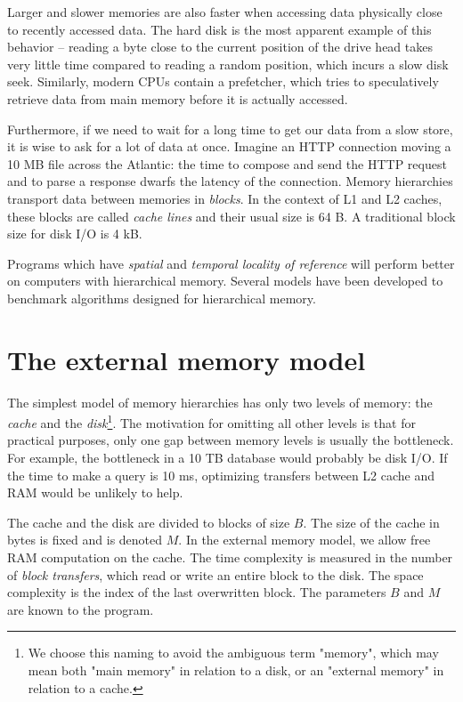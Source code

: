 Larger and slower memories are also faster when accessing data physically
close to recently accessed data. The hard disk is the most apparent example
of this behavior -- reading a byte close to the current position of the drive
head takes very little time compared to reading a random position, which incurs
a slow disk seek. %
Similarly, modern CPUs contain a prefetcher, which tries to speculatively
retrieve data from main memory before it is actually accessed.

Furthermore, if we need to wait for a long time to get our data from a slow
store, it is wise to ask for a lot of data at once. Imagine an HTTP connection
moving a 10 MB file across the Atlantic: the time to compose and send the HTTP
request and to parse a response dwarfs the latency of the connection.
Memory hierarchies transport data between memories in \textit{blocks}.
In the context of L1 and L2 caches, these blocks are called \textit{cache lines}
and their usual size is 64 B. A traditional block size for disk I/O is 4 kB.

Programs which have \textit{spatial} and \textit{temporal locality of reference}
will perform better on computers with hierarchical memory. Several models have
been developed to benchmark algorithms designed for hierarchical memory.

\section{The external memory model}
The simplest model of memory hierarchies has only two levels of memory:
the \textit{cache} and the \textit{disk}\footnote{
	We choose this naming to avoid the ambiguous term "memory",
	which may mean both "main memory" in relation to a disk,
	or an "external memory" in relation to a cache.
}. The motivation for omitting all other levels is that for practical purposes,
only one gap between memory levels is usually the bottleneck. For example,
the bottleneck in a 10 TB database would probably be disk I/O. If the time
to make a query is 10 ms, optimizing transfers between L2 cache and RAM would
be unlikely to help.

The cache and the disk are divided to blocks of size $B$. The size of the cache 
in bytes is fixed and is denoted $M$.
In the external memory model, we allow free RAM computation on the cache.
The time complexity is measured in the number of \textit{block transfers},
which read or write an entire block to the disk. The space complexity is
the index of the last overwritten block.
The parameters $B$ and $M$ are known to the program.

